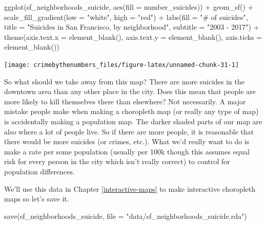 \documentclass[
  12pt,
]{book}
\newenvironment{Shaded}{\begin{snugshade}}{\end{snugshade}}
\newcommand{\AttributeTok}[1]{\textcolor[rgb]{0.61,0.61,0.61}{#1}}
\newcommand{\FunctionTok}[1]{\textcolor[rgb]{0,0,0}{#1}}
\newcommand{\NormalTok}[1]{#1}
\newcommand{\SpecialCharTok}[1]{\textcolor[rgb]{0,0,0}{#1}}
\newcommand{\StringTok}[1]{\textcolor[rgb]{0.5,0.5,0.5}{#1}}
\begin{document}
\begin{Shaded}
\begin{Highlighting}[]
\FunctionTok{ggplot}\NormalTok{(sf\_neighborhoods\_suicide, }\FunctionTok{aes}\NormalTok{(}\AttributeTok{fill =}\NormalTok{ number\_suicides)) }\SpecialCharTok{+}
  \FunctionTok{geom\_sf}\NormalTok{() }\SpecialCharTok{+}
  \FunctionTok{scale\_fill\_gradient}\NormalTok{(}\AttributeTok{low =} \StringTok{"white"}\NormalTok{, }\AttributeTok{high =} \StringTok{"red"}\NormalTok{) }\SpecialCharTok{+}
  \FunctionTok{labs}\NormalTok{(}\AttributeTok{fill =} \StringTok{"\# of suicides"}\NormalTok{,}
       \AttributeTok{title =} \StringTok{"Suicides in San Francisco, by neighborhood"}\NormalTok{,}
       \AttributeTok{subtitle =} \StringTok{"2003 {-} 2017"}\NormalTok{) }\SpecialCharTok{+}
  \FunctionTok{theme}\NormalTok{(}\AttributeTok{axis.text.x =} \FunctionTok{element\_blank}\NormalTok{(),}
        \AttributeTok{axis.text.y =} \FunctionTok{element\_blank}\NormalTok{(),}
        \AttributeTok{axis.ticks =} \FunctionTok{element\_blank}\NormalTok{())}
\end{Highlighting}
\end{Shaded}

\begin{center}\texttt{[image: crimebythenumbers\_files/figure-latex/unnamed-chunk-31-1]} \end{center}

So what should we take away from this map? There are more suicides in the downtown area than any other place in the city. Does this mean that people are more likely to kill themselves there than elsewhere? Not necessarily. A major mistake people make when making a choropleth map (or really any type of map) is accidentally making a population map. The darker shaded parts of our map are also where a lot of people live. So if there are more people, it is reasonable that there would be more suicides (or crimes, etc.). What we'd really want to do is make a rate per some population (usually per 100k though this assumes equal risk for every person in the city which isn't really correct) to control for population differences.

We'll use this data in Chapter \ref{interactive-maps} to make interactive choropleth maps so let's save it.

\begin{Shaded}
\begin{Highlighting}[]
\FunctionTok{save}\NormalTok{(sf\_neighborhoods\_suicide, }\AttributeTok{file =} \StringTok{"data/sf\_neighborhoods\_suicide.rda"}\NormalTok{)}
\end{Highlighting}
\end{Shaded}
\end{document}

